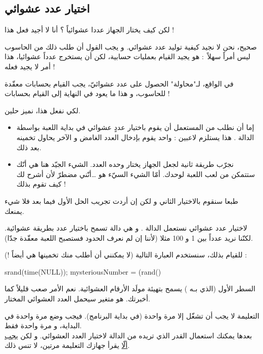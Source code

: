 \subsection{اختيار عدد عشوائي}

\begin{question}
لكن كيف يختار الجهاز عددا عشوائياً ؟ أنا لا أجيد فعل هذا !
\end{question}

صحيح، نحن لا نجيد كيفية توليد عدد عشوائي. و يجب القول أن طلب ذلك من الحاسوب ليس أمراً سهلاً~: هو يجيد القيام بعمليات حسابية، لكن أن يستخرج عدداً عشوائيا، هذا أمر لا يجيد فعله !

في الواقع، لـ"محاولة" الحصول على عدد عشوائيّ، يجب القيام بحسابات معقّدة للحاسوب، و هذا ما يعود في النهاية إلى القيام بحسابات !

لكي نفعل هذا، نميز حلين.
\begin{itemize}
	\item إما أن نطلب من المستعمل أن يقوم باختيار عددٍ عشوائي في بداية اللعبة بواسطة الدالة 
	.
	هذا يستلزم لاعبين : واحد يقوم بإدخال العدد الغامض و الآخر يحاول تخمينه بعد ذلك.
	\item نجرّب طريقة ثانية لجعل الجهاز يختار وحده العدد. الشيء الجيّد هنا هي أنّك ستتمكن من لعب اللعبة لوحدك. أمّا الشيء السيّء هو \dots أنّني مضطرّ لأن أشرح لك كيف تقوم بذلك !
\end{itemize}

طبعا سنقوم بالاختيار الثاني و لكن إن أردت تجريب الحل الأول فيما بعد فلا شيء يمنعك.

لاختيار عدد عشوائي نستعمل الدالة 
.
و هي دالة تسمح باختيار عدد بطريقة عشوائية. لكنّنا نريد عدداً بين 1 و 100 مثلا (لأننا إن لم نعرف الحدود فستصبح اللعبة معقّدة جدّا).

للقيام بذلك، سنستخدم العبارة التالية (لا يمكنني أن أطلب منك تخمينها هي أيضاً !) :

\begin{Csource}
srand(time(NULL));
mysteriousNumber = (rand() %
\end{Csource}

السطر الأول (الذي بـه
)
يسمح بتهيئة مولَد الأرقام العشوائية. نعم الأمر صعب قليلاً كما أخبرتك.
هو متغير سيحمل العدد العشوائي المختار.

\begin{warning}
التعليمة 
لا يجب أن تشغّل إلا مرة واحدة (في بداية البرنامج). فيجب وضع 
مرة واحدة في البداية، و مرة واحدة فقط. \\
بعدها يمكنك استعمال القدر الذي تريده من الدالة 
لاختيار العدد العشوائي. و لكن 
\underline{يجب ألّا}
 يقرأ جهازك التعليمة
مرتين، لا تنس ذلك.
\end{warning}

